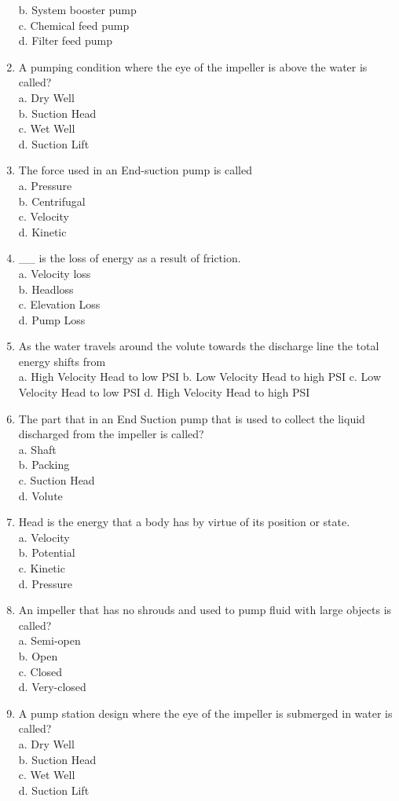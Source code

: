 \begin{enumerate}[1.]
b. System booster pump\\
c. Chemical feed pump\\
d. Filter feed pump\\
\item A pumping condition where the eye of the impeller is above the water is called?\\
a. Dry Well\\
b. Suction Head\\
c. Wet Well\\
d. Suction Lift\\
\item The force used in an End-suction pump is called\\
a. Pressure\\
b. Centrifugal\\
c. Velocity\\
d. Kinetic\\
\item \_\_ is the loss of energy as a result of friction.\\
a. Velocity loss\\
b. Headloss\\
c. Elevation Loss\\
d. Pump Loss\\
\item As the water travels around the volute towards the discharge line the total energy shifts from\\
a. High Velocity Head to low PSI b. Low Velocity Head to high PSI c. Low Velocity Head to low PSI d. High Velocity Head to high PSI\\
\item The part that in an End Suction pump that is used to collect the liquid discharged from the impeller is called?\\
a. Shaft\\
b. Packing\\
c. Suction Head\\
d. Volute\\
\item Head is the energy that a body has by virtue of its position or state.\\
a. Velocity\\
b. Potential\\
c. Kinetic\\
d. Pressure\\
\item An impeller that has no shrouds and used to pump fluid with large objects is called?\\
a. Semi-open\\
b. Open\\
c. Closed\\
d. Very-closed\\
\item A pump station design where the eye of the impeller is submerged in water is called?\\
a. Dry Well\\
b. Suction Head\\
c. Wet Well\\
d. Suction Lift\\


\end{enumerate}
